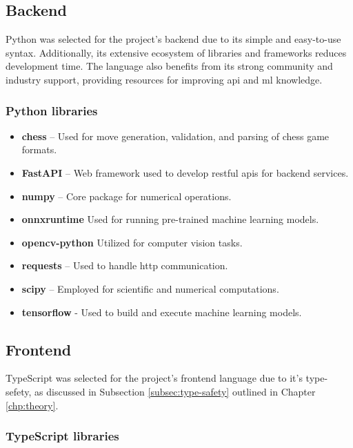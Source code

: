\subsection*{Backend}

Python was selected for the project's backend due to its simple and easy-to-use syntax. Additionally, its extensive ecosystem of libraries and frameworks reduces development time. The language also benefits from its strong community and industry support, providing resources for improving \gls{api} and \gls{ml} knowledge.

\subsubsection*{Python libraries}

\begin{itemize}
    \item \textbf{chess} – Used for move generation, validation, and parsing of chess game formats. \cite{python:chess}
    \item \textbf{FastAPI} – Web framework used to develop \acrshort{rest}ful \glspl{api} for backend services. \cite{python:fastapi}
    \item \textbf{numpy} – Core package for numerical operations. \cite{python:numpy}
    \item \textbf{onnxruntime} Used for running pre-trained machine learning models. \cite{python:onnx}
    \item \textbf{opencv-python} Utilized for computer vision tasks. \cite{python:opencv}
    \item \textbf{requests} – Used to handle \gls{http} communication. \cite{python:requests}
    \item \textbf{scipy} – Employed for scientific and numerical computations. \cite{python:scipy}
    \item \textbf{tensorflow} - Used to build and execute machine learning models. \cite{python:tensorflow}
\end{itemize}


\subsection*{Frontend}

TypeScript was selected for the project's frontend language due to it's type-sefety, as discussed in Subsection \ref{subsec:type-safety} outlined in Chapter \ref{chp:theory}.

\subsubsection*{TypeScript libraries}

